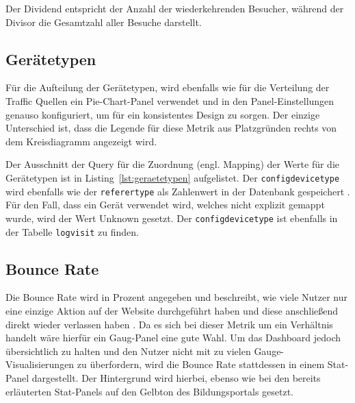 Der Dividend entspricht der Anzahl der wiederkehrenden Besucher, während der Divisor die Gesamtzahl aller Besuche darstellt.

\subsection{Gerätetypen}
Für die Aufteilung der Gerätetypen, wird ebenfalls wie für die \glqq Verteilung der Traffic Quellen\grqq{} ein Pie-Chart-Panel verwendet und in den Panel-Einstellungen genauso konfiguriert, um für ein konsistentes Design zu sorgen. Der einzige Unterschied ist, dass die Legende für diese Metrik aus Platzgründen rechts von dem Kreisdiagramm angezeigt wird.

\begin{figure}[H]
    \centering
    \begin{minipage}{\textwidth}
        
    \end{minipage}
\end{figure}

Der Ausschnitt der Query für die Zuordnung (engl. Mapping) der Werte für die Gerätetypen ist in Listing~\ref{lst:geraetetypen} aufgelistet. Der \texttt{config\textunderscore device\textunderscore type} wird ebenfalls wie der \texttt{referer\textunderscore type} als Zahlenwert in der Datenbank gespeichert \parencite{GithubDevices}. Für den Fall, dass ein Gerät verwendet wird, welches nicht explizit gemappt wurde, wird der Wert \glqq Unknown\grqq{} gesetzt. Der \texttt{config\textunderscore device\textunderscore type} ist ebenfalls in der Tabelle \texttt{log\textunderscore visit} zu finden. 

\subsection{Bounce Rate}
Die \glqq Bounce Rate\grqq{} wird in Prozent angegeben und beschreibt, wie viele Nutzer nur eine einzige Aktion auf der Website durchgeführt haben und diese anschließend direkt wieder verlassen haben \parencite[S.33]{Dykes2014}. Da es sich bei dieser Metrik um ein Verhältnis handelt wäre hierfür ein Gaug-Panel eine gute Wahl. Um das Dashboard jedoch übersichtlich zu halten und den Nutzer nicht mit zu vielen Gauge-Visualisierungen zu überfordern, wird die Bounce Rate stattdessen in einem Stat-Panel dargestellt. Der Hintergrund wird hierbei, ebenso wie bei den bereits erläuterten Stat-Panels auf den Gelbton des Bildungsportals gesetzt.

